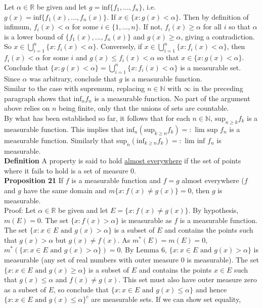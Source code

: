 \documentclass[a4paper]{article}
\begin{document}
Let $\alpha \in \mathbb{R}$ be given and let $g = \text{inf}\{f_1,...,f_n\}$, i.e. $g(x) = \text{inf}\{f_1(x),...,f_n(x)\}$. If $x \in \{x : g(x) < \alpha\}$. Then by definition of infimum, $f_i(x) < \alpha$ for some $i \in \{1,...,n\}$. If not, $f_i(x) \geq \alpha$ for all $i$ so that $\alpha$ is a lower bound of $\{f_1(x),...,f_n(x)\}$ and $g(x) \geq \alpha$, giving a contradiction. So $x \in \bigcup_{i=1}^n \{x : f_i(x) < \alpha\}$. Conversely, if $x \in \bigcup_{i=1}^n \{x : f_i(x) < \alpha\}$, then $f_i(x) < \alpha$ for some $i$ and $g(x) \leq f_i(x) < \alpha$ so that $x \in \{x : g(x) < \alpha\}$. Conclude that $\{x : g(x) < \alpha\}= \bigcup_{i=1}^n \{x : f_i(x) < \alpha\}$ is a measurable set. Since $\alpha$ was arbitrary, conclude that $g$ is a measurable function.\\

Similar to the case with supremum, replacing $n \in \mathbb{N}$ with $\infty$ in the preceding paragraph shows that $\text{inf}_n f_n$ is a measurable function. No part of the argument above relies on $n$ being finite, only that the unions of sets are countable.\\

By what has been established so far, it follows that for each $n \in \mathbb{N}$, $\text{sup}_{n\geq k} f_k$ is a measurable function. This implies that $\text{inf}_{n} \left(\text{sup}_{k\geq n} f_k \right) =: \text{ lim sup } f_n$ is a measurable function. Similarly that $\text{sup}_{n} \left(\text{inf}_{k\geq n} f_k \right) =: \text{ lim inf } f_n$ is measurable. \\

{\bf Definition} A property is said to hold \underline{almost everywhere} if the set of points where it fails to hold is a set of measure 0. \\

{\bf Proposition 21} If $f$ is a measurable function and $f = g$ almost everywhere ($f$ and $g$ have the same domain and $m\{x : f(x) \neq g(x)\} = 0$, then $g$ is measurable. \\

Proof: Let $\alpha \in \mathbb{R}$ be given and let $E = \{x : f(x) \neq g(x)\}$. By hypothesis, $m(E) = 0$. The set $\{x : f(x) > \alpha\}$ is measurable as $f$ is a measurable function. The set $\{x: x \in E \text{ and } g(x) > \alpha \}$ is a subset of $E$ and contains the points such that $g(x) > \alpha$ but $g(x) \neq f(x)$. As $m^*(E) = m(E) = 0$, $m^*(\{x: x \in E \text{ and } g(x) > \alpha \}) = 0$. By Lemma 6, $\{x: x \in E \text{ and } g(x) > \alpha \}$ is measurable (any set of real numbers with outer measure 0 is measurable). The set $\{x: x \in E \text{ and } g(x) \geq \alpha\}$ is a subset of $E$ and contains the points $x \in E$ such that $g(x) \leq \alpha$ and $f(x) \neq g(x)$. This set must also have outer measure zero as a subset of $E$, so conclude that $\{x: x \in E \text{ and } g(x) \leq \alpha \}$ and hence $\{x: x \in E \text{ and } g(x) \leq \alpha \}^c$ are measurable sets. If we can show set equality,
\end{document}
